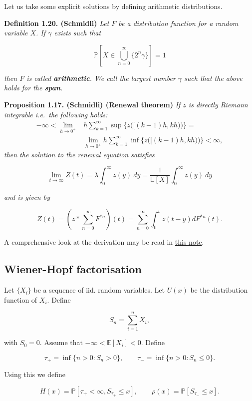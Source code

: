 \documentclass[a4paper,12pt,openany]{book}
\begin{document}
Let us take some explicit solutions by defining arithmetic distributions.

\textbf{Definition 1.20. (Schmidli)} \emph{Let \(F\) be a distribution function for a random variable \(X\). If \(\gamma\) exists such that}

\[
\mathbb P\left[X\in\bigcup_{n=0}^\infty \{2^n\gamma\}\right]=1
\]

\emph{then \(F\) is called \textbf{arithmetic}. We call the largest number \(\gamma\) such that the above holds for the \textbf{span}.}

\textbf{Proposition 1.17. (Schmidli) (Renewal theorem)} \emph{If \(z\) is directly Riemann integrable i.e.~the following holds:}
\begin{align*}
-\infty<\lim_{h\to 0^+}&h\sum_{k=1}^\infty\sup\Big\{z\big([(k-1)h,kh)\big)\Big\}=\\
&\lim_{h\to 0^+}h\sum_{k=1}^\infty\inf\Big\{z\big([(k-1)h,kh)\big)\Big\}<\infty,
\end{align*}
\emph{then the solution to the renewal equation satisfies}

\[
\lim_{t\to\infty}Z(t)=\lambda \int_0^\infty z(y)\ dy=\frac{1}{\mathbb E[X]}\int_0^\infty z(y)\ dy
\]

\emph{and is given by}

\[
Z(t)=\left(z*\sum_{n=0}^\infty F^{*n}\right)(t)=\sum_{n=0}^\infty\int_0^tz(t-y)dF^{*n}(t).
\]

A comprehensive look at the derivation may be read in \href{https://halweb.uc3m.es/esp/personal/personas/bdauria/1112/stoc_proc_phd/Notes/2012-02-28Tu_Notes.pdf}{this note}.

\hypertarget{wiener-hopf-factorisation}{%
\subsection{Wiener-Hopf factorisation}\label{wiener-hopf-factorisation}}

Let \(\{X_i\}\) be a sequence of iid. random variables. Let \(U(x)\) be the distribution function of \(X_i\). Define

\[
S_n=\sum_{i=1}^nX_i,
\]

with \(S_0=0\). Assume that \(-\infty<\mathbb E[X_i]<0\). Define

\[
\tau_+=\inf\{n > 0 : S_n>0\},\qquad \tau_-=\inf\{n>0 : S_n\le 0\}.
\]

Using this we define

\[
H(x)=\mathbb P[\tau_+<\infty, S_{\tau_+}\le x],\qquad \rho(x)=\mathbb P[S_{\tau_-}\le x].
\]
\end{document}
